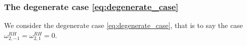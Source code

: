 \documentclass{amsart}
\begin{document}

\subsubsection{The degenerate case \eqref{eq:degenerate_case}} \label{subsec:second_step}
We consider the degenerate case \eqref{eq:degenerate_case}, that is to say the case $\omega^{RH}_{2,-1}=\omega^{RH}_{2,1}=0$.
\end{document}
